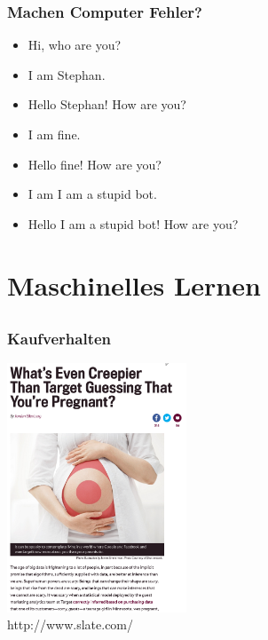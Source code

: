 \documentclass[12pt]{beamer}
\begin{document}
\begin{frame}
  \frametitle{Machen Computer Fehler?}
  \begin{itemize}
    \item<2-> Hi, who are you?
    \item<3-> I am Stephan.
    \item<4-> Hello Stephan! How are you?
    \item<5-> I am fine.
    \item<6-> Hello fine! How are you?
    \item<7-> I am I am a stupid bot.
    \item<8-> Hello I am a stupid bot! How are you?
  \end{itemize}
\end{frame}

\section{Maschinelles Lernen}
\subsection{}

\begin{frame}
  \frametitle{Kaufverhalten}
  \pause
  \begin{center}
    \includegraphics[width=0.4\textwidth]{img/pregnant.png} \\
    \tiny http://www.slate.com/
  \end{center}
\end{frame}
\end{document}
